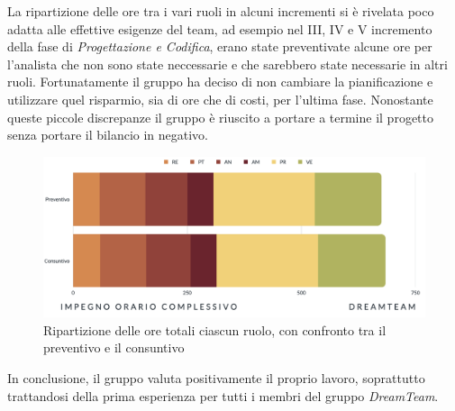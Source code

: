 La ripartizione delle ore tra i vari ruoli in alcuni incrementi si è rivelata poco adatta alle effettive esigenze del team, ad esempio nel III, IV e V incremento della fase di \textit{Progettazione e Codifica}, erano state preventivate alcune ore per l'analista che non sono state neccessarie e che sarebbero state necessarie in altri ruoli. Fortunatamente il gruppo ha deciso di non cambiare la pianificazione e utilizzare quel risparmio, sia di ore che di costi, per l'ultima fase. Nonostante queste piccole discrepanze il gruppo è riuscito a portare a termine il progetto senza portare il bilancio in negativo.

\begin{figure}[H]
\centering
\includegraphics[scale=0.53]{Sezioni/SezioniPreventivo/grafici/Impegno_orario_complessivo.png}
\caption{Ripartizione delle ore totali ciascun ruolo, con confronto tra il preventivo e il consuntivo}
\end{figure}

In conclusione, il gruppo valuta positivamente il proprio lavoro, soprattutto trattandosi della prima esperienza per tutti i membri del gruppo \textit{DreamTeam}.



